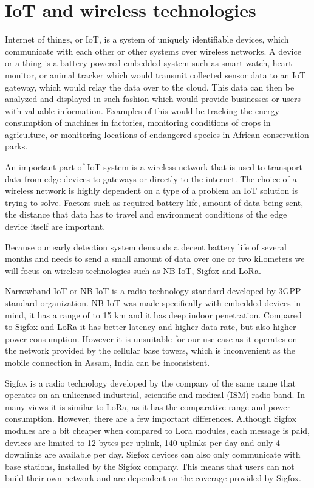 \section{ IoT and wireless technologies}

Internet of things, or IoT, is a system of uniquely identifiable devices, which communicate with each other or other systems over wireless networks\cite{IoT}.
A device or a thing is a battery powered embedded system such as smart watch, heart monitor, or animal tracker which would transmit collected sensor data to an IoT gateway, which would relay the data over to the cloud.
This data can then be analyzed and displayed in such fashion which would provide businesses or users with valuable information.
Examples of this would be tracking the energy consumption of machines in factories, monitoring conditions of crops in agriculture, or monitoring locations of endangered species in African conservation parks.

An important part of IoT system is a wireless network that is used to transport data from edge devices to gateways or directly to the internet.
The choice of a wireless network is highly dependent on a type of a problem an IoT solution is trying to solve.
Factors such as required battery life, amount of data being sent, the distance that data has to travel and environment conditions of the edge device itself are important.

Because our early detection system demands a decent battery life of several months and needs to send a small amount of data over one or two kilometers we will focus on wireless technologies such as NB-IoT, Sigfox and LoRa.

Narrowband IoT or NB-IoT is a radio technology standard developed by 3GPP standard organization\cite{lora_nbiot}.
NB-IoT was made specifically with embedded devices in mind, it has a range of to 15 \si{\kilo\meter} and it has deep indoor penetration\cite{lora_nbiot}.
Compared to Sigfox and LoRa it has better latency and higher data rate, but also higher power consumption\cite{lora_nbiot_sigfox}.
However it is unsuitable for our use case as it operates on the network provided by the cellular base towers, which is inconvenient as the mobile connection in Assam, India can be inconsistent\cite{wildlabs-elephants}.

Sigfox is a radio technology developed by the company of the same name that operates on an unlicensed industrial, scientific and medical (ISM) radio band.
In many views it is similar to LoRa, as it has the comparative range and power consumption\cite{lora_nbiot_sigfox}.
However, there are a few important differences.
Although Sigfox modules are a bit cheaper when compared to Lora modules, each message is paid, devices are limited to 12 bytes per uplink, 140 uplinks per day and only 4 downlinks are available per day.
Sigfox devices can also only communicate with base stations, installed by the Sigfox company\cite{lora_nbiot_sigfox}.
This means that users can not build their own network and are dependent on the coverage provided by Sigfox.

